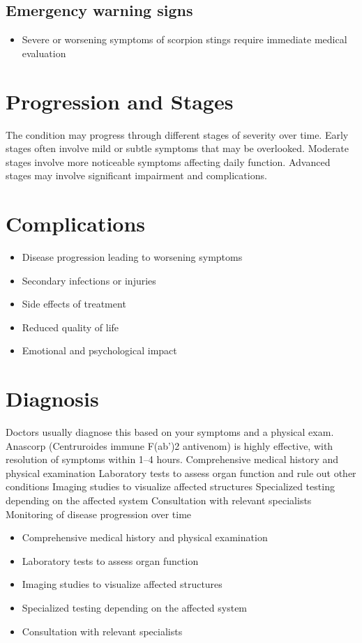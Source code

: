\subsection{Emergency warning signs}
\begin{itemize}[noitemsep]
  \item Severe or worsening symptoms of scorpion stings require immediate medical evaluation
\end{itemize}
\section{Progression and Stages}
The condition may progress through different stages of severity over time. Early stages often involve mild or subtle symptoms that may be overlooked. Moderate stages involve more noticeable symptoms affecting daily function. Advanced stages may involve significant impairment and complications.
\section{Complications}
\begin{itemize}[noitemsep]
  \item Disease progression leading to worsening symptoms
  \item Secondary infections or injuries
  \item Side effects of treatment
  \item Reduced quality of life
  \item Emotional and psychological impact
\end{itemize}
\section{Diagnosis}
Doctors usually diagnose this based on your symptoms and a physical exam. Anascorp (Centruroides immune F(ab')2 antivenom) is highly effective, with resolution of symptoms within 1--4 hours. Comprehensive medical history and physical examination Laboratory tests to assess organ function and rule out other conditions Imaging studies to visualize affected structures Specialized testing depending on the affected system Consultation with relevant specialists Monitoring of disease progression over time

\begin{itemize}[noitemsep]
  \item Comprehensive medical history and physical examination
  \item Laboratory tests to assess organ function
  \item Imaging studies to visualize affected structures
  \item Specialized testing depending on the affected system
  \item Consultation with relevant specialists
\end{itemize}
